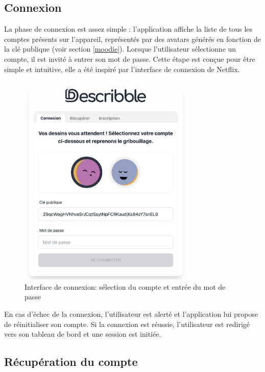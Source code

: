 \subsection{Connexion}

La phase de connexion est assez simple : l'application affiche la liste de tous les comptes présents sur l'appareil, représentés par des avatars générés en fonction de la clé publique (voir section \ref{moodie}). Lorsque l'utilisateur sélectionne un compte, il est invité à entrer son mot de passe. Cette étape est conçue pour être simple et intuitive, elle a été inspiré par l'interface de connexion de Netflix.

\begin{figure}[H]
    \centering
    \includegraphics[width=0.75\textwidth]{assets/figures/describble-login.png}
    \caption{Interface de connexion: sélection du compte et entrée du mot de passe}
\end{figure}

En cas d'échec de la connexion, l'utilisateur est alerté et l'application lui propose de réinitialiser son compte. Si la connexion est réussie, l'utilisateur est redirigé vers son tableau de bord et une session est initiée.

\subsection{Récupération du compte}

